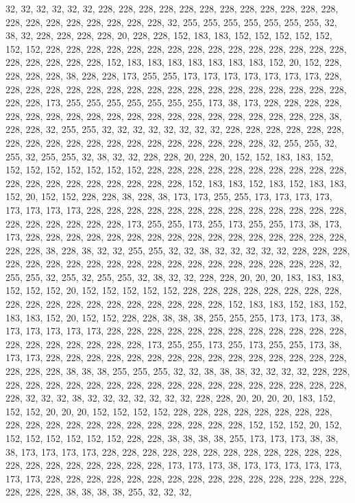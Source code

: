 {	32,  32,  32,  32,  32,  32,  228, 228, 228, 228, 228, 228, 228, 228, 228, 228, 228, 228, 228, 228, 228, 228, 228, 228, 228, 228, 32,  255, 255, 255, 255, 255, 255, 255, 32,  38,  32,  228, 228, 228, 228, 20,  228, 228, 152, 183, 183, 152, 152, 152, 152, 152, 152, 152, 228, 228, 228, 228, 228, 228, 228, 228, 228, 228, 228, 228, 228, 228, 228, 228, 228, 228, 228, 228, 152, 183, 183, 183, 183, 183, 183, 183, 152, 20,  152, 228, 228, 228, 228, 38,  228, 228, 173, 255, 255, 173, 173, 173, 173, 173, 173, 173, 228, 228, 228, 228, 228, 228, 228, 228, 228, 228, 228, 228, 228, 228, 228, 228, 228, 228, 228, 228, 173, 255, 255, 255, 255, 255, 255, 255, 173, 38,  173, 228, 228, 228, 228, 228, 228, 228, 228, 228, 228, 228, 228, 228, 228, 228, 228, 228, 228, 228, 228, 38,  228, 228, 32,  255, 255, 32,  
	32,  32,  32,  32,  32,  32,  32,  228, 228, 228, 228, 228, 228, 228, 228, 228, 228, 228, 228, 228, 228, 228, 228, 228, 228, 228, 32,  255, 255, 32,  255, 32,  255, 255, 32,  38,  32,  32,  228, 228, 20,  228, 20,  152, 152, 183, 183, 152, 152, 152, 152, 152, 152, 152, 152, 228, 228, 228, 228, 228, 228, 228, 228, 228, 228, 228, 228, 228, 228, 228, 228, 228, 228, 228, 152, 183, 183, 152, 183, 152, 183, 183, 152, 20,  152, 152, 228, 228, 38,  228, 38,  173, 173, 255, 255, 173, 173, 173, 173, 173, 173, 173, 173, 228, 228, 228, 228, 228, 228, 228, 228, 228, 228, 228, 228, 228, 228, 228, 228, 228, 228, 228, 173, 255, 255, 173, 255, 173, 255, 255, 173, 38,  173, 173, 228, 228, 228, 228, 228, 228, 228, 228, 228, 228, 228, 228, 228, 228, 228, 228, 228, 228, 38,  228, 38,  32,  32,  255, 255, 32,  
	32,  38,  32,  32,  32,  32,  32,  228, 228, 228, 228, 228, 228, 228, 228, 228, 228, 228, 228, 228, 228, 228, 228, 228, 228, 228, 32,  255, 255, 32,  255, 32,  255, 255, 32,  38,  32,  32,  228, 228, 20,  20,  20,  183, 183, 183, 152, 152, 152, 20,  152, 152, 152, 152, 152, 228, 228, 228, 228, 228, 228, 228, 228, 228, 228, 228, 228, 228, 228, 228, 228, 228, 228, 228, 152, 183, 183, 152, 183, 152, 183, 183, 152, 20,  152, 152, 228, 228, 38,  38,  38,  255, 255, 255, 173, 173, 173, 38,  173, 173, 173, 173, 173, 228, 228, 228, 228, 228, 228, 228, 228, 228, 228, 228, 228, 228, 228, 228, 228, 228, 228, 228, 173, 255, 255, 173, 255, 173, 255, 255, 173, 38,  173, 173, 228, 228, 228, 228, 228, 228, 228, 228, 228, 228, 228, 228, 228, 228, 228, 228, 228, 228, 38,  38,  38,  255, 255, 255, 32,  32,  
	38,  38,  38,  32,  32,  32,  32,  228, 228, 228, 228, 228, 228, 228, 228, 228, 228, 228, 228, 228, 228, 228, 228, 228, 228, 228, 228, 32,  32,  32,  38,  32,  32,  32,  32,  32,  32,  32,  228, 228, 20,  20,  20,  20,  183, 152, 152, 152, 20,  20,  20,  152, 152, 152, 152, 228, 228, 228, 228, 228, 228, 228, 228, 228, 228, 228, 228, 228, 228, 228, 228, 228, 228, 228, 228, 152, 152, 152, 20,  152, 152, 152, 152, 152, 152, 152, 228, 228, 38,  38,  38,  38,  255, 173, 173, 173, 38,  38,  38,  173, 173, 173, 173, 228, 228, 228, 228, 228, 228, 228, 228, 228, 228, 228, 228, 228, 228, 228, 228, 228, 228, 228, 228, 173, 173, 173, 38,  173, 173, 173, 173, 173, 173, 173, 228, 228, 228, 228, 228, 228, 228, 228, 228, 228, 228, 228, 228, 228, 228, 228, 228, 228, 38,  38,  38,  38,  255, 32,  32,  32,  
}
